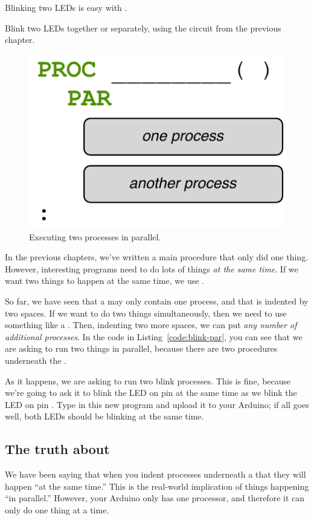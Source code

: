 Blinking two LEDs is easy with \plumbing.

\GOALS
Blink two LEDs together or separately, using the circuit from the previous chapter.

\CODE


\PATTERNS

\begin{figure}[h]
  \begin{center}
    \includegraphics[width=0.6\linewidth]{images/pattern-par}
    \caption{Executing two processes in parallel.}
    \label{pattern:par}
  \end{center}
\end{figure}

In the previous chapters, we've written a {\procname main} procedure that only did one thing. However, interesting programs need to do lots of things {\em at the same time}. If we want two things to happen at the same time, we use \PAR.

So far, we have seen that a \PROC may only contain one process, and that is indented by two spaces. If we want to do two things simultaneously, then we need to use something like a \PAR. Then, indenting two more spaces, we can put {\em any number of additional processes}. In the code in Listing~\vref{code:blink-par}, you can see that we are asking \plumbing to run two things in parallel, because there are two procedures underneath the \PAR.

As it happens, we are asking \plumbing to run two {\procname blink} processes. This is fine, because we're going to ask it to blink the LED on pin {} at the same time as we blink the LED on pin {}. Type in this new program and upload it to your Arduino; if all goes well, both LEDs should be blinking at the same time.

\subsection{The truth about \PAR}
We have been saying that when you indent processes underneath a \PAR that they will happen ``at the same time.'' This is the real-world implication of things happening ``in parallel.'' However, your Arduino only has one processor, and therefore it can only do one thing at a time.

